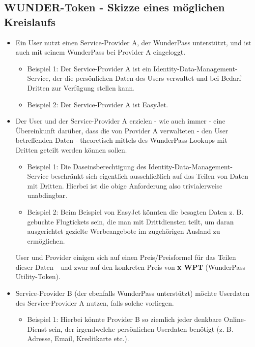 
\subsection{WUNDER-Token - Skizze eines möglichen Kreislaufs}
\vspace{0.3cm}

\begin{Solution}

\begin{itemize}
  \item Ein User nutzt einen Service-Provider A, der WunderPass unterstützt, und ist auch mit seinem WunderPass bei Provider A eingeloggt.
  \begin{itemize}
  	\item Beispiel 1: Der Service-Provider A ist ein Identity-Data-Management-Service, der die persönlichen Daten des Users verwaltet und bei Bedarf Dritten zur Verfügung stellen kann.
  	\item Beispiel 2: Der Service-Provider A ist EasyJet.
  \end{itemize}
  \item Der User und der Service-Provider A erzielen - wie auch immer - eine Übereinkunft darüber, dass die von Provider A verwalteten - den User betreffenden Daten - theoretisch mittels des WunderPass-Lookups mit Dritten geteilt werden können sollen. 
  \begin{itemize}
  	\item Beispiel 1: Die Daseinsberechtigung des Identity-Data-Management-Service beschränkt sich eigentlich ausschließlich auf das Teilen von Daten mit Dritten. Hierbei ist die obige Anforderung also trivialerweise unabdingbar.
  	\item Beispiel 2: Beim Beispiel von EasyJet könnten die besagten Daten z. B. gebuchte Flugtickets sein, die man mit Drittdiensten teilt, um daran ausgerichtet gezielte Werbeangebote im zugehörigen Ausland zu ermöglichen.
  \end{itemize}
  User und Provider einigen sich auf einen Preis/Preisformel für das Teilen dieser Daten - und zwar auf den konkreten Preis von \textbf{x WPT} (WunderPass-Utility-Token).
  \item Service-Provider B (der ebenfalls WunderPass unterstützt) möchte Userdaten des Service-Provider A nutzen, falls solche vorliegen.
  \begin{itemize}
  	\item Beispiel 1: Hierbei könnte Provider B so ziemlich jeder denkbare Online-Dienst sein, der irgendwelche persönlichen Userdaten benötigt (z. B. Adresse, Email, Kreditkarte etc.).

\end{itemize}
\end{itemize}
\end{Solution}
